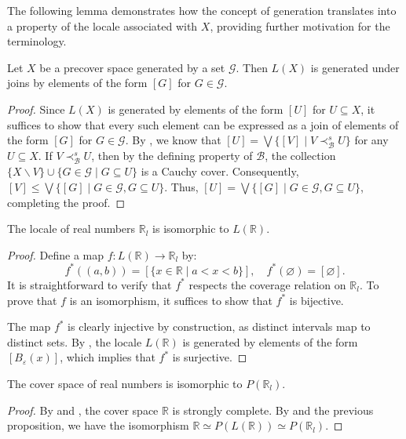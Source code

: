 \documentclass[pdflatex,sn-mathphys-num]{sn-jnl}
\theoremstyle{definition}
\theoremstyle{remark}
\numberwithin{figure}{section}
\newcommand{\rb}{\prec}
\begin{document}
The following lemma demonstrates how the concept of generation translates into a property of the locale associated with $X$, providing further motivation for the terminology.

\begin{lem}
Let $X$ be a precover space generated by a set $\mathcal{G}$.
Then $L(X)$ is generated under joins by elements of the form $[G]$ for $G \in \mathcal{G}$.
\end{lem}
\begin{proof}
Since $L(X)$ is generated by elements of the form $[U]$ for $U \subseteq X$, it suffices to show that every such element can be expressed as a join of elements of the form $[G]$ for $G \in \mathcal{G}$.
By , we know that $[U] = \bigvee \{ [V] \mid V \rb^s_\mathcal{B} U \}$ for any $U \subseteq X$.
If $V \rb^s_\mathcal{B} U$, then by the defining property of $\mathcal{B}$, the collection $\{ X \backslash V \} \cup \{ G \in \mathcal{G} \mid G \subseteq U \}$ is a Cauchy cover.
Consequently, $[V] \leq \bigvee \{ [G] \mid G \in \mathcal{G}, G \subseteq U \}$.
Thus, $[U] = \bigvee \{ [G] \mid G \in \mathcal{G}, G \subseteq U \}$, completing the proof.
\end{proof}

\begin{prop}
The locale of real numbers $\mathbb{R}_l$ is isomorphic to $L(\mathbb{R})$.
\end{prop}
\begin{proof}
Define a map $f : L(\mathbb{R}) \to \mathbb{R}_l$ by:
\[ f^*((a,b)) = [\{ x \in \mathbb{R} \mid a < x < b \}], \quad f^*(\varnothing) = [\varnothing]. \]
It is straightforward to verify that $f^*$ respects the coverage relation on $\mathbb{R}_l$.
To prove that $f$ is an isomorphism, it suffices to show that $f^*$ is bijective.

The map $f^*$ is clearly injective by construction, as distinct intervals map to distinct sets.
By , the locale $L(\mathbb{R})$ is generated by elements of the form $[B_\varepsilon(x)]$, which implies that $f^*$ is surjective.
\end{proof}

\begin{cor}
The cover space of real numbers is isomorphic to $P(\mathbb{R}_l)$.
\end{cor}
\begin{proof}
By  and , the cover space $\mathbb{R}$ is strongly complete.
By  and the previous proposition, we have the isomorphism $\mathbb{R} \simeq P(L(\mathbb{R})) \simeq P(\mathbb{R}_l)$.
\end{proof}
\end{document}
